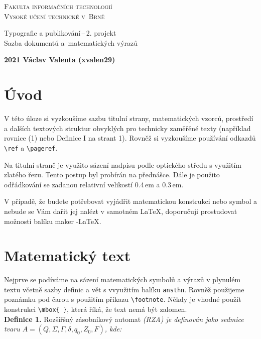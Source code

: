 \documentclass[a4paper, 11pt, twocolumn]{article}
\begin{document}
\begin{titlepage}
\onecolumn
\begin{center}
\Huge
\textsc{Fakulta informačních technologií\\[0.4em]
Vysoké učení technické v~Brně}\\
 
\LARGE
Typografie a publikování\,--\,2. projekt\\[0.3em]
Sazba dokumentú a~matematických výrazů\\

\Large
\textbf{ 2021 \hfill Václav Valenta (xvalen29)}

\end{center} 
\end{titlepage}

\thispagestyle{plain}
\clearpage

\twocolumn
\section*{Úvod}
V této úloze si vyzkoušíme sazbu titulní strany, matematických vzorců, prostředí a dalších textových struktur obvyklých pro technicky zaměřěné texty (například rovnice (1) nebo Definice I na strant 1). Rovněž si vyzkoušíme používání odkazdů \verb=\ref= a \verb=\pageref=.

Na titulní straně je využito sázení nadpisu podle optického středu s využitím zlatého řezu. Tento postup byl probírán na přednášce. Dále je použito odřádkování se zadanou relativní velikostí 0.4\,em a 0.3\,em.

V případě, že budete potřebovat vyjádřit matematickou konstrukci nebo symbol a nebude se Vám dařit jej nalézt v samotném \LaTeX, doporučuji prostudovat možnosti balíku maker \AmS\--\LaTeX.

\section{Matematický text}
Nejprve se podíváme na sázení matematických symbolů a výrazů v plynulém textu včetně sazby definic a vět s vvyužitím balíku \verb=ansthn=. Rovněž použijeme poznámku pod čarou s použitím příkazu \verb=\footnote=. Někdy je vhodné použít konstrukci \verb=\mbox{ }=, která říká, že text nemá být zalomen.\\

\noindent
\textbf{Definice 1.} Rozšířšný zásobníkový automat \textit{(RZA) je definován jako sedmice tvaru
$A=(Q, \Sigma, \Gamma, \delta, q_{0}, Z_{0}, F)$,
kde:}
\end{document}
